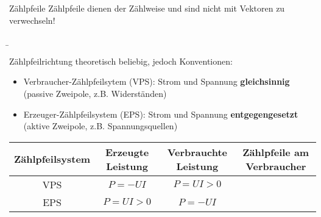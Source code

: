 \begin{frame}
{		
		\begin{Merksatz}{Zählpfeile}
			Zählpfeile dienen der Zählweise und sind nicht mit Vektoren zu verwechseln!
		\end{Merksatz}
		
	}
	
	
	
	\b{
		Zählpfeilrichtung theoretisch beliebig, jedoch Konventionen: 
		\begin{itemize}
			\item Verbraucher-Zählpfeilsytem (VPS): Strom und Spannung \textbf{gleichsinnig}\\
			      (passive Zweipole, z.B. Widerständen)
			\item Erzeuger-Zählpfeilsystem (EPS): Strom und Spannung \textbf{entgegengesetzt}\\
			      (aktive Zweipole, z.B. Spannungsquellen)
		\end{itemize}
		
		
		
		\begin{table}[h!]
			\centering
			\begin{tabular}{|c|c|c|c|}
				\hline
				Zählpfeilsystem & Erzeugte Leistung & Verbrauchte Leistung & Zählpfeile am Verbraucher                                                      \\ \hline
				VPS             & $P = -UI$           & $P = UI > 0$           &  \\ \hline
				EPS             & $P = UI > 0$        & $P = -UI$              &  \\ \hline
			\end{tabular}
			
		\end{table}
		
}
\end{frame}
